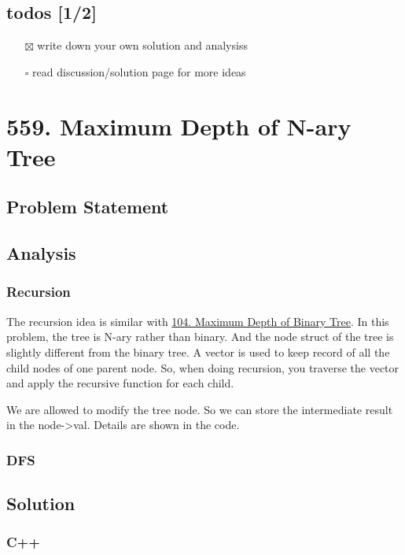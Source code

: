 \documentclass[11pt]{article}
\begin{document}
\subsection{todos [1/2]}
\label{sec:orgf81f67c}
\begin{itemize}
\item[{$\boxtimes$}] write down your own solution and analysiss
\item[{$\square$}] read discussion/solution page for more ideas
\end{itemize}
\section{559. Maximum Depth of N-ary Tree \label{org2f3deb2}}
\label{sec:orgfc37429}
\subsection{Problem Statement}
\label{sec:org93e3236}
\subsection{Analysis}
\label{sec:org424ef5a}
\subsubsection{Recursion}
\label{sec:orge56da04}
The recursion idea is similar with \hyperref[org9605041]{104. Maximum Depth of Binary Tree}. In this problem, the tree is N-ary rather than binary. And the node struct of the tree is slightly different from the binary tree. A vector is used to keep record of all the child nodes of one parent node. So, when doing recursion, you traverse the vector and apply the recursive function for each child.

We are allowed to modify the tree node. So we can store the intermediate result in the node->val. Details are shown in the code.
\subsubsection{DFS}
\label{sec:orge31e40a}

\subsection{Solution}
\label{sec:orgb375d47}
\subsubsection{C++}
\label{sec:orgdc92552}
\end{document}
